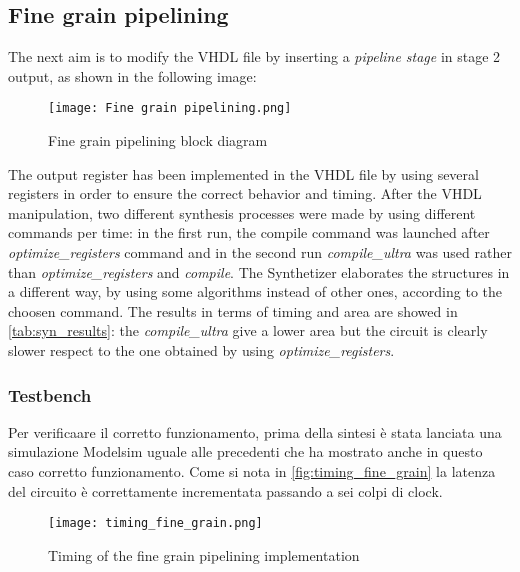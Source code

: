 \subsection{Fine grain pipelining}
The next aim is to modify the VHDL file by inserting a \textit{pipeline stage} in stage 2 output, as shown in the following image:
\begin{figure}[H]
	\center
	\texttt{[image: Fine grain pipelining.png]}
	\caption{Fine grain pipelining block diagram}
	\label{fig:mult_struct}
\end{figure}
The output register has been implemented in the VHDL file by using several registers in order to ensure the correct behavior and timing.  After the VHDL manipulation, two different synthesis processes were made by using different commands per time: in the first run, the compile command was launched after \textit{optimize\_registers} command and in the second run  \textit{compile\_ultra} was used rather than \textit{optimize\_registers} and \textit{compile}. The Synthetizer elaborates the structures in a different way, by using some algorithms instead of other ones, according to the choosen command. The results in terms of timing and area are showed in \autoref{tab:syn_results}: the \textit{compile\_ultra} give a lower area but the circuit is clearly slower respect to the one obtained by using \textit{optimize\_registers}.

\subsubsection{Testbench}
Per verificaare il corretto funzionamento, prima della sintesi è stata lanciata una simulazione Modelsim uguale alle precedenti che ha mostrato anche in questo caso corretto funzionamento. Come si nota in \autoref{fig:timing_fine_grain} la latenza del circuito è correttamente incrementata passando a sei colpi di clock.

\begin{figure}[h]
	\center
	\texttt{[image: timing\_fine\_grain.png]}
	\caption{Timing of the fine grain pipelining implementation}
	\label{fig:timing_fine_grain}
\end{figure}


